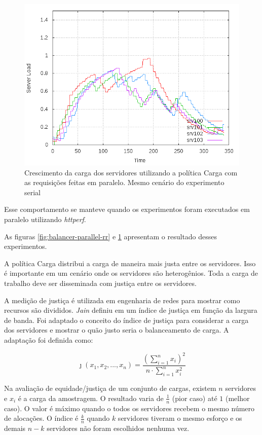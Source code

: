 \begin{figure}[htb!]
    \centering
    \includegraphics[scale=0.5]{img/balancer-parallel-load}
    \caption{Crescimento da carga dos servidores utilizando a política Carga
    com as requisições feitas em paralelo. Mesmo cenário do experimento serial}
    \label{fig:balancer-parallel-load}
\end{figure}

Esse comportamento se manteve quando os experimentos foram executados em 
paralelo utilizando \emph{httperf}.

As figuras \ref{fig:balancer-parallel-rr} e \ref{fig:balancer-parallel-load}
apresentam o resultado desses experimentos.

A política Carga distribui a carga de maneira mais justa entre os servidores.
Isso é importante em um cenário onde os servidores são heterogênios.
Toda a carga de trabalho deve ser disseminada com justiça entre os servidores.

A medição de justiça é utilizada em engenharia de redes para mostrar como 
recursos são divididos.
\emph{Jain} definiu em \citep{jain} um índice de justiça em função da 
largura de banda.
Foi adaptado o conceito do índice de justiça para considerar a carga dos 
servidores e mostrar o quão justo seria o balanceamento de carga.
A adaptação foi definida como:


\[\jmath \left ( x_1, x_2,..., x_n \right ) = \frac{\left ( \sum_{i=1}^{n} x_i\right )^2}{n \cdot \sum_{i=1}^{n} x_i^2}\]

Na avaliação de equidade/justiça de um conjunto de cargas, existem $n$
servidores e $x_i$ é a carga da amostragem.
O resultado varia de $\frac{1}{n}$ (pior caso) até $1$ (melhor caso).
O valor é máximo quando o todos os servidores recebem o mesmo número de 
alocações.
O índice é $\frac{k}{n}$ quando $k$ servidores tiveram o mesmo esforço e 
os demais $n-k$ servidores não foram escolhidos nenhuma vez. 

